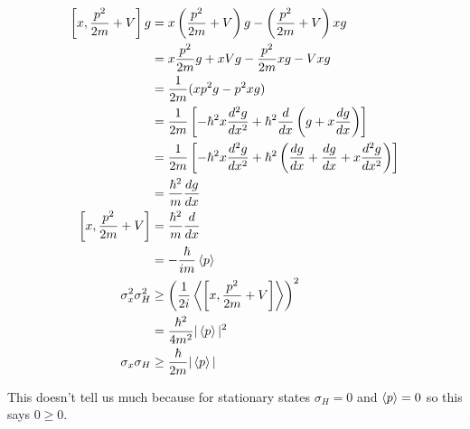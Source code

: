 \documentclass{article}
\begin{document}
\begin{align*}
  \left[ x, \frac{p^2}{2 m} + V \right] g & = x \left( \frac{p^2}{2 m} + V \right) g - \left( \frac{p^2}{2 m} + V \right) x g                                                                \\
                                          & = x \frac{p^2}{2 m} g + x V g - \frac{p^2}{2 m} x g - V x g                                                                                      \\
                                          & = \frac{1}{2 m} (x p^2 g - p^2 x g)                                                                                                              \\
                                          & = \frac{1}{2 m} \left[ -\hbar^2 x \frac{d^2 g}{d x^2} + \hbar^2 \frac{d}{d x} \left( g + x \frac{d g}{d x} \right) \right]                       \\
                                          & = \frac{1}{2 m} \left[ -\hbar^2 x \frac{d^2 g}{d x^2} + \hbar^2 \left( \frac{d g}{d x} + \frac{d g}{d x} + x \frac{d^2 g}{d x^2} \right) \right] \\
                                          & = \frac{\hbar^2}{m} \frac{d g}{d x}                                                                                                              \\
  \left[ x, \frac{p^2}{2 m} + V \right]   & = \frac{\hbar^2}{m} \frac{d}{d x}                                                                                                                \\
                                          & = -\frac{\hbar}{i m} \braket{p}                                                                                                                  \\
  \sigma_x^2 \sigma_H^2                   & \ge \left( \frac{1}{2 i} \Braket{\left[ x, \frac{p^2}{2 m} + V \right]} \right)^2                                                                \\
                                          & = \frac{\hbar^2}{4 m^2} |\braket{p}|^2                                                                                                           \\
  \sigma_x \sigma_H                       & \ge \frac{\hbar}{2 m} |\braket{p}|
\end{align*}

This doesn't tell us much because for stationary states $\sigma_H = 0$ and $\braket{p} = 0$ so this says $0 \ge 0$.
\end{document}
